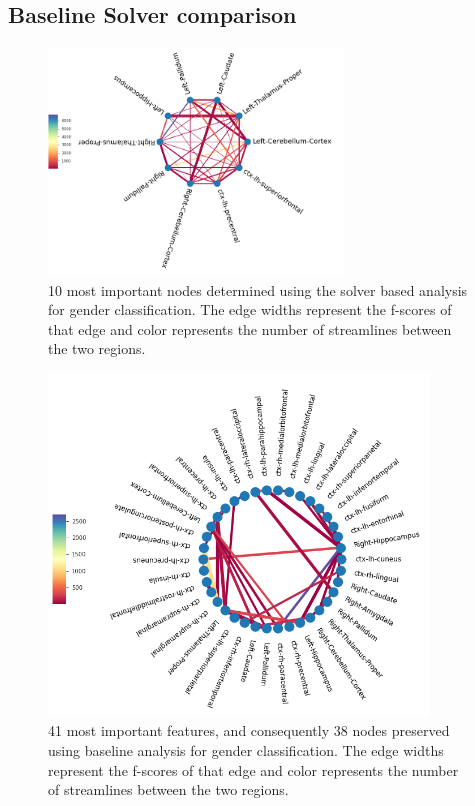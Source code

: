 \documentclass[msthesis.tex]{subfiles}
\begin{document}
\subsection{Baseline Solver comparison}
\begin{figure}
    \centering
    \includegraphics[width=0.7\textwidth]{images/solver_10nodes_strls.png}
    \caption{10 most important nodes determined using the solver based analysis for gender classification. The edge widths represent the f-scores of that edge and color represents the number of streamlines between the two regions.}
    \label{fig:gender_num_strls_10}
\end{figure}

\begin{figure}
    \centering
    \includegraphics[width=0.9\textwidth]{images/baseline_42f_10nodes.png}
    \caption{41 most important features, and consequently 38 nodes preserved using baseline analysis for gender classification. The edge widths represent the f-scores of that edge and color represents the number of streamlines between the two regions.}
    \label{fig:baseline_num_strls_10}
\end{figure}
\end{document}
